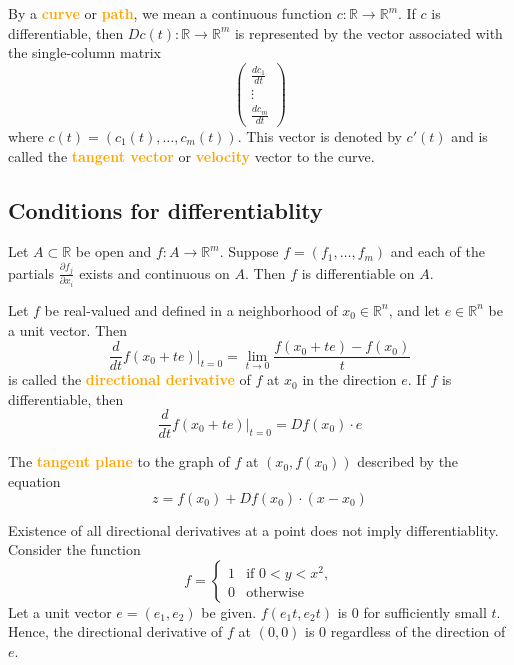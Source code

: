\begin{definition}
By a \textbf{\textcolor{orange}{curve}} or \textbf{\textcolor{orange}{path}}, we mean a continuous function $c:\mathbb{R}\to \mathbb{R}^m$. If $c$ is differentiable, then $Dc(t):\mathbb{R}\to \mathbb{R}^m$ is represented by the vector associated with the single-column matrix
\begingroup
\everymath{\displaystyle}
$$\begin{pmatrix}
\frac{dc_1}{dt} \\
\vdots \\
\frac{dc_m}{dt}
\end{pmatrix}$$
\endgroup
where $c(t)=(c_1(t),\dots, c_m(t))$. This vector is denoted by $c'(t)$ and is called the \textbf{\textcolor{orange}{tangent vector}} or \textbf{\textcolor{orange}{velocity}} vector to the curve.
\end{definition}

\subsection{Conditions for differentiablity}

\begin{theorem}
Let $A\subset \mathbb{R}$ be open and $f:A\to \mathbb{R}^m$. Suppose $f=(f_1,\dots,f_m)$ and each of the partials $\frac{\partial f_j}{\partial x_i}$ exists and continuous on $A$. Then $f$ is differentiable on $A$.
\end{theorem}

\begin{definition}
Let $f$ be real-valued and defined in a neighborhood of $x_0\in \mathbb{R}^n$, and let $e\in \mathbb{R}^n$ be a unit vector. Then
$$\frac{d}{dt}f(x_0+te)|_{t=0}=\lim_{t\to 0}\frac{f(x_0+te)-f(x_0)}{t}$$
is called the \textbf{\textcolor{orange}{directional derivative}} of $f$ at $x_0$ in the direction $e$. If $f$ is differentiable, then
$$\frac{d}{dt}f(x_0+te)|_{t=0}=Df(x_0)\cdot e$$
\end{definition}

\begin{definition}
The \textbf{\textcolor{orange}{tangent plane}} to the graph of $f$ at $(x_0,f(x_0))$ described by the equation
$$z=f(x_0)+Df(x_0)\cdot (x-x_0)$$
\end{definition}

\begin{example}
[(marsden 6.4.3)]
Existence of all directional derivatives at a point does not imply differentiablity. Consider the function
\[
f=
\begin{cases}
    1 & \text{if }0<y<x^2, \\
    0 & \text{otherwise}
\end{cases}
\]
Let a unit vector $e=(e_1,e_2)$ be given. $f(e_1t,e_2t)$ is 0 for sufficiently small $t$. Hence, the directional derivative of $f$ at $(0,0)$ is 0 regardless of the direction of $e$.
\end{example}

